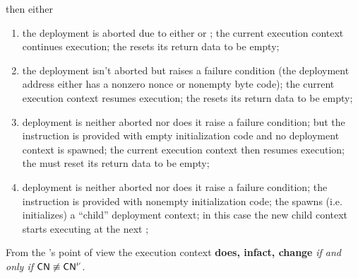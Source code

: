 \begin{description}
		then either
		\begin{enumerate}
			\item
				the deployment is aborted due to either \balAbortSH{} or \csdAbortSH{};
				the current execution context continues execution;
				the \zkEvm{} resets its return data to be empty;
			\item
				the deployment isn't aborted but raises a failure condition (the deployment address either has a nonzero nonce or nonempty byte code);
				the current execution context resumes execution;
				the \zkEvm{} resets its return data to be empty;
			\item
				deployment is neither aborted nor does it raise a failure condition;
				but the instruction is provided with empty initialization code and no deployment context is spawned;
				the current execution context then resumes execution;
				the \zkEvm{} must reset its return data to be empty;
			\item
				deployment is neither aborted nor does it raise a failure condition;
				the instruction is provided with nonempty initialization code;
				the \zkEvm{} spawns (i.e. initializes) a ``child'' deployment context;
				in this case the new child context starts executing at the next \hubStamp{};
		\end{enumerate}
\end{description}
\saNote{} From the \zkEvm{}'s point of view the execution context \textbf{does, infact, change} \emph{if and only if} $\textsf{CN} \not\equiv \textsf{CN}^{\nu}$.
